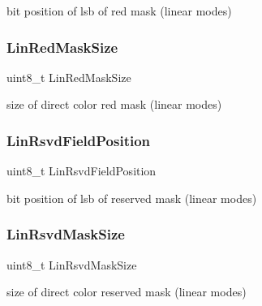bit position of lsb of red mask (linear modes) 

\hypertarget{structvbe__mode__info__t_a1fbcef2402fe6ce7f6c006bd50eaa6da}{}\label{structvbe__mode__info__t_a1fbcef2402fe6ce7f6c006bd50eaa6da} 
\subsubsection{\texorpdfstring{Lin\+Red\+Mask\+Size}{LinRedMaskSize}}
{\footnotesize\ttfamily uint8\+\_\+t Lin\+Red\+Mask\+Size}



size of direct color red mask (linear modes) 

\hypertarget{structvbe__mode__info__t_a3df070e698b5f54814e20c8813f7bf7e}{}\label{structvbe__mode__info__t_a3df070e698b5f54814e20c8813f7bf7e} 
\subsubsection{\texorpdfstring{Lin\+Rsvd\+Field\+Position}{LinRsvdFieldPosition}}
{\footnotesize\ttfamily uint8\+\_\+t Lin\+Rsvd\+Field\+Position}



bit position of lsb of reserved mask (linear modes) 

\hypertarget{structvbe__mode__info__t_a334886fc9a915ff91966c3aac1da586a}{}\label{structvbe__mode__info__t_a334886fc9a915ff91966c3aac1da586a} 
\subsubsection{\texorpdfstring{Lin\+Rsvd\+Mask\+Size}{LinRsvdMaskSize}}
{\footnotesize\ttfamily uint8\+\_\+t Lin\+Rsvd\+Mask\+Size}



size of direct color reserved mask (linear modes) 

